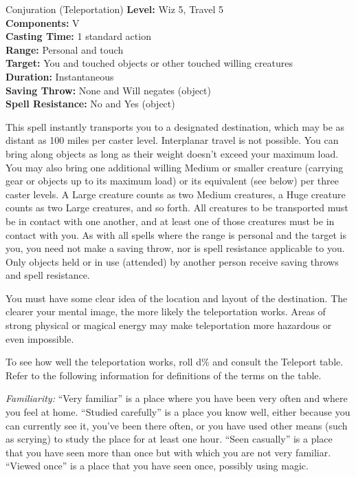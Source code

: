 {Conjuration (Teleportation)}
{
	\textbf{Level:}
	Wiz 5, Travel 5\\
	\textbf{Components:}
	V\\
	\textbf{Casting Time:}
	1 standard action\\
	\textbf{Range:}
	Personal and touch\\
	\textbf{Target:}
	You and touched objects or other touched willing creatures\\
	\textbf{Duration:}
	Instantaneous\\
	\textbf{Saving Throw:}
	None and Will negates (object)\\
	\textbf{Spell Resistance:}
	No and Yes (object)\\
}
{
	This spell instantly transports you to a designated destination, which may be as distant as 100 miles per caster level. Interplanar travel is not possible. You can bring along objects as long as their weight doesn't exceed your maximum load. You may also bring one additional willing Medium or smaller creature (carrying gear or objects up to its maximum load) or its equivalent (see below) per three caster levels. A Large creature counts as two Medium creatures, a Huge creature counts as two Large creatures, and so forth. All creatures to be transported must be in contact with one another, and at least one of those creatures must be in contact with you. As with all spells where the range is personal and the target is you, you need not make a saving throw, nor is spell resistance applicable to you. Only objects held or in use (attended) by another person receive saving throws and spell resistance.

	You must have some clear idea of the location and layout of the destination. The clearer your mental image, the more likely the teleportation works. Areas of strong physical or magical energy may make teleportation more hazardous or even impossible.

	To see how well the teleportation works, roll d\% and consult the Teleport table. Refer to the following information for definitions of the terms on the table.

	\textit{Familiarity:}
	``Very familiar'' is a place where you have been very often and where you feel at home. ``Studied carefully'' is a place you know well, either because you can currently see it, you've been there often, or you have used other means (such as scrying) to study the place for at least one hour. ``Seen casually'' is a place that you have seen more than once but with which you are not very familiar. ``Viewed once'' is a place that you have seen once, possibly using magic.

}
